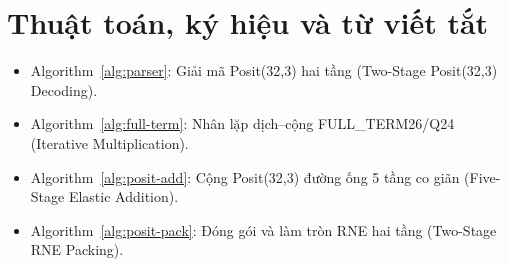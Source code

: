 \chapter*{Thuật toán, ký hiệu và từ viết tắt}
\begin{itemize}
  \item Algorithm~\ref{alg:parser}: Giải mã Posit(32,3) hai tầng (Two-Stage Posit(32,3) Decoding).
  \item Algorithm~\ref{alg:full-term}: Nhân lặp dịch--cộng FULL\_TERM26/Q24 (Iterative Multiplication).
  \item Algorithm~\ref{alg:posit-add}: Cộng Posit(32,3) đường ống 5 tầng co giãn (Five-Stage Elastic Addition).
  \item Algorithm~\ref{alg:posit-pack}: Đóng gói và làm tròn RNE hai tầng (Two-Stage RNE Packing).
\end{itemize}
